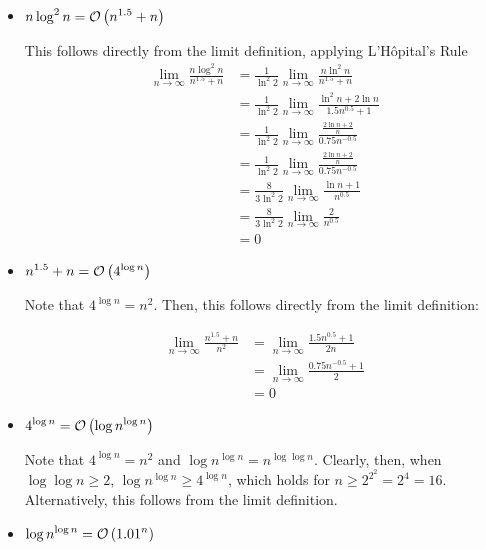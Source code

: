 \documentclass[final]{article}
\begin{document}
\begin{solution}
\begin{itemize}
        \item $\displaystyle n\log^2{n} =\mathcal{O}\left(n^{1.5} + n\right)$

              This follows directly from the limit definition, applying L'H\^{o}pital's Rule
              \begin{align*}\lim_{n\to\infty}\frac{n\log^2{n}}{n^{1.5} + n}
                   & = \frac{1}{\ln^2{2}}\lim_{n\to\infty}\frac{n\ln^2{n}}{n^{1.5} + n}              \\
                   & = \frac{1}{\ln^2{2}}\lim_{n\to\infty}\frac{\ln^2{n} + 2\ln{n}}{1.5n^{0.5} + 1}  \\
                   & = \frac{1}{\ln^2{2}}\lim_{n\to\infty}\frac{\frac{2\ln{n} + 2}{n}}{0.75n^{-0.5}} \\
                   & = \frac{1}{\ln^2{2}}\lim_{n\to\infty}\frac{\frac{2\ln{n} + 2}{n}}{0.75n^{-0.5}} \\
                   & = \frac{8}{3\ln^2{2}}\lim_{n\to\infty}\frac{\ln n + 1}{n^{0.5}}                 \\
                   & = \frac{8}{3\ln^2{2}}\lim_{n\to\infty}\frac{2}{n^{0.5}}                         \\
                   & = 0
              \end{align*}

        \item $\displaystyle n^{1.5} + n = \mathcal{O}\left(4^{\log{n}}\right)$

              Note that $4^{\log{n}} = n^2$. Then, this follows directly from the limit definition:

              \begin{align*}\lim_{n\to\infty}\frac{n^{1.5} + n}{n^2}
                   & = \lim_{n\to\infty} \frac{1.5n^{0.5} + 1}{2n}  \\
                   & = \lim_{n\to\infty} \frac{0.75n^{-0.5} + 1}{2} \\
                   & = 0
              \end{align*}

        \item $\displaystyle 4^{\log{n}} = \mathcal{O}\left(\log{n}^{\log{n}}\right)$

              Note that $4^{\log{n}} = n^2$ and $\log{n}^{\log{n}} = n^{\log{\log{n}}}$. Clearly, then, when $\log\log{n} \geq 2$, $\log{n}^{\log{n}} \geq 4^{\log{n}}$, which holds for $n \geq 2^{2^2} = 2^4 = 16$. Alternatively, this follows from the limit definition.

        \item $\displaystyle \log{n}^{\log{n}} = \mathcal{O}\left({1.01}^n\right)$


\end{itemize}
\end{solution}
\end{document}
